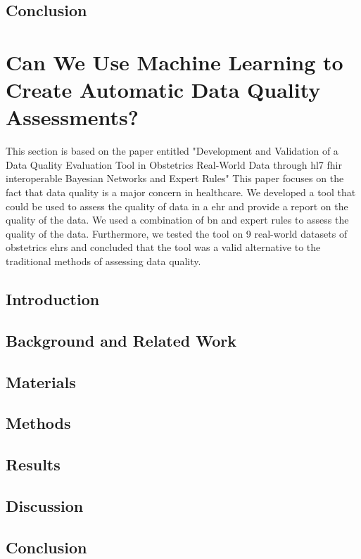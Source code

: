 \subsection{Conclusion}



\section{Can We Use Machine Learning to Create Automatic Data Quality Assessments?}\label{subsec:dq}
This section is based on the paper entitled "Development and Validation of a Data Quality Evaluation Tool in Obstetrics Real-World Data through \ac{hl7} \ac{fhir} interoperable Bayesian Networks and Expert Rules" This paper focuses on the fact that data quality is a major concern in healthcare. We developed a tool that could be used to assess the quality of data in a \ac{ehr} and provide a report on the quality of the data. We used a combination of \ac{bn} and expert rules to assess the quality of the data. Furthermore, we tested the tool on 9 real-world datasets of obstetrics \acp{ehr} and concluded that the tool was a valid alternative to the traditional methods of assessing data quality.
%
\subsection{Introduction}

\subsection{Background and Related Work}

\subsection{Materials}

\subsection{Methods}

\subsection{Results}

\subsection{Discussion}

\subsection{Conclusion}



